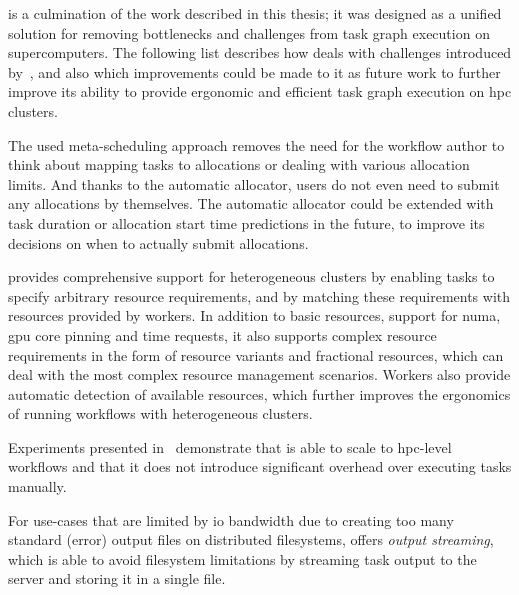 \hyperqueue{} is a culmination of the work described in this thesis; it was
designed as a unified solution for removing bottlenecks and challenges from task graph execution on
supercomputers. The following list describes how \hyperqueue{} deals with challenges
introduced by~, and also which improvements could be made to it as future
work to further improve its ability to provide ergonomic and efficient task graph execution on
\gls{hpc} clusters.
\begin{description}[wide=0pt]
	\item[Allocation manager] The used meta-scheduling approach removes the need for the workflow author to think about mapping
		tasks to allocations or dealing with various allocation limits. And thanks to the automatic
		allocator, users do not even need to submit any allocations by themselves. The automatic allocator
		could be extended with task duration or allocation start time predictions in the future, to improve
		its decisions on when to actually submit allocations.
	\item[Cluster heterogeneity] \hyperqueue{} provides comprehensive support for heterogeneous
		clusters by enabling tasks to specify arbitrary resource requirements, and by matching these
		requirements with resources provided by workers. In addition to basic resources, support for
		\gls{numa}, \gls{gpu} core pinning and time requests, it also
		supports complex resource requirements in the form of resource variants and fractional resources,
		which can deal with the most complex resource management scenarios. Workers also provide automatic
		detection of available resources, which further improves the ergonomics of running workflows with
		heterogeneous clusters.
	\item[Performance and scalability] Experiments presented in~ demonstrate that \hyperqueue{} is
		able to scale to \gls{hpc}-level workflows and that it does not introduce
		significant overhead over executing tasks manually.

		For use-cases that are limited by \gls{io} bandwidth due to creating too many
		standard (error) output files on distributed filesystems, \hyperqueue{} offers
		\emph{output streaming}, which is able to avoid filesystem limitations by streaming task output
		to the server and storing it in a single file.


\end{description}
